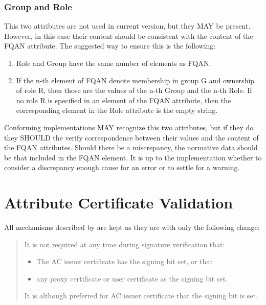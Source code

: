 \documentclass[a4]{article}
\begin{document}
\subsubsection{Group and Role}

This two attributes are not used in current version, but they MAY be
present.  However, in this case their content should be consistent
with the content of the FQAN attribute. The suggested way to ensure
this is the following:
\begin{enumerate}
\item Role and Group have the same number of elements as FQAN.
\item If the n-th element of FQAN denote membership in group G and
  ownership of role R, then those are the values of the n-th Group and
  the n-th Role. If no role R is specified in an element of the FQAN
  attribute, then the corresponding element in the Role attribute is
  the empty string.
\end{enumerate}
Conforming implementations MAY recognize this two attributes, but if
they do they SHOULD the verify correspondence between their values and
the content of the FQAN attributes.  Should there be a miscrepancy,
the normative data should be that included in the FQAN element.  It is
up to the implementation whether to consider a discrepancy enough
cause for an error or to settle for a warning.

\section{Attribute Certificate Validation}
All mechanisms described by \cite{rfc3281} are kept as they are with only
the following change:
\begin{quote}
It is not required at any time during signature verification that:
\begin{itemize}
\item The AC issuer certificate has the signing bit set, or that
\item any proxy certificate or user certificate as the signing bit
  set.
\end{itemize}
It is although preferred for AC issuer certificate that the signing
bit is set.
\end{quote}
\end{document}
